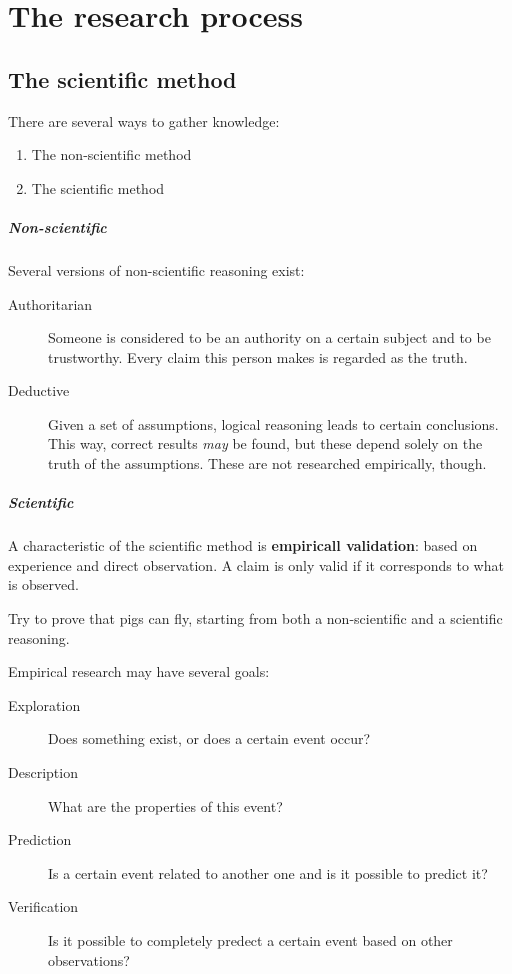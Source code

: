 \chapter{The research process}
\section{The scientific method}

There are several ways to gather knowledge:

\begin{enumerate}
	\item The non-scientific method
	\item The scientific method
\end{enumerate}

\paragraph{Non-scientific} Several versions of non-scientific reasoning exist:
\begin{description}
	\item [Authoritarian] Someone is considered to be an authority on a certain subject and to be trustworthy. Every claim this person makes is regarded as the truth.
	\item [Deductive] Given a set of assumptions, logical reasoning leads to certain conclusions. This way, correct results \emph{may} be found, but these depend solely on the truth of the assumptions. These are not researched empirically, though.
\end{description}

\paragraph{Scientific} A characteristic of the scientific method is \textbf{empiricall validation}: based on experience and direct observation. A claim is only valid if it corresponds to what is observed.

\begin{exercise}
Try to prove that pigs can fly, starting from both a non-scientific and a scientific reasoning.
\end{exercise}

Empirical research may have several goals:

\begin{description}
    \item[Exploration] Does something exist, or does a certain event occur?
    \item[Description] What are the properties of this event?
    \item[Prediction] Is a certain event related to another one and is it possible to predict it?
    \item[Verification] Is it possible to completely predect a certain event based on other observations?
\end{description}

